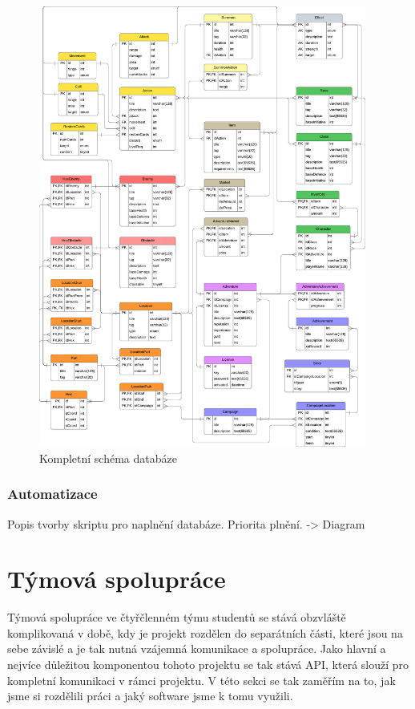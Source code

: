 \begin{figure}[!h]
    \centering
    \includegraphics[width=0.96\textwidth]{../../shared/diagrams/dbScheme}
    \caption{Kompletní schéma databáze}
    \label{fig:db_scheme}
\end{figure}

\subsubsection*{Automatizace}
\label{subsubsec:implementation-technologies-database-automatization}
Popis tvorby skriptu pro naplnění databáze. Priorita plnění. -> Diagram

\section{Týmová spolupráce}
\label{sec:implementation-collaboration}
Týmová spolupráce ve čtyřčlenném týmu studentů se stává obzvláště komplikovaná v době, kdy je projekt rozdělen do separátních části, které jsou na sebe závislé a je tak nutná vzájemná komunikace a spolupráce. Jako hlavní a nejvíce důležitou komponentou tohoto projektu se tak stává API, která slouží pro kompletní komunikaci v rámci projektu. V této sekci se tak zaměřím na to, jak jsme si rozdělili práci a jaký software jsme k tomu využili.

